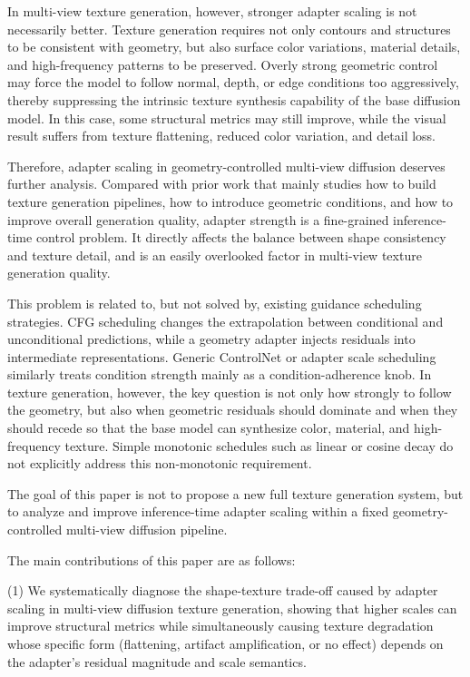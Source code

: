 \documentclass[times,twocolumn,final]{elsarticle}
\begin{document}
In multi-view texture generation, however, stronger adapter scaling is not necessarily better. Texture generation requires not only contours and structures to be consistent with geometry, but also surface color variations, material details, and high-frequency patterns to be preserved. Overly strong geometric control may force the model to follow normal, depth, or edge conditions too aggressively, thereby suppressing the intrinsic texture synthesis capability of the base diffusion model. In this case, some structural metrics may still improve, while the visual result suffers from texture flattening, reduced color variation, and detail loss.

Therefore, adapter scaling in geometry-controlled multi-view diffusion deserves further analysis. Compared with prior work that mainly studies how to build texture generation pipelines, how to introduce geometric conditions, and how to improve overall generation quality, adapter strength is a fine-grained inference-time control problem. It directly affects the balance between shape consistency and texture detail, and is an easily overlooked factor in multi-view texture generation quality.

This problem is related to, but not solved by, existing guidance scheduling strategies. CFG scheduling changes the extrapolation between conditional and unconditional predictions, while a geometry adapter injects residuals into intermediate representations. Generic ControlNet or adapter scale scheduling similarly treats condition strength mainly as a condition-adherence knob. In texture generation, however, the key question is not only how strongly to follow the geometry, but also when geometric residuals should dominate and when they should recede so that the base model can synthesize color, material, and high-frequency texture. Simple monotonic schedules such as linear or cosine decay do not explicitly address this non-monotonic requirement.

The goal of this paper is not to propose a new full texture generation system, but to analyze and improve inference-time adapter scaling within a fixed geometry-controlled multi-view diffusion pipeline.

The main contributions of this paper are as follows:

(1) We systematically diagnose the shape-texture trade-off caused by adapter scaling in multi-view diffusion texture generation, showing that higher scales can improve structural metrics while simultaneously causing texture degradation whose specific form (flattening, artifact amplification, or no effect) depends on the adapter's residual magnitude and scale semantics.
\end{document}
